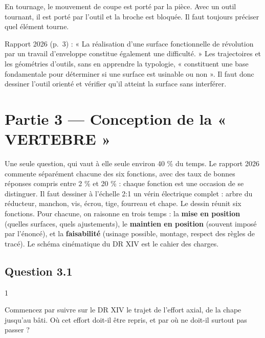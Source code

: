 \documentclass[11pt,a4paper]{article}
\begin{document}
\begin{methode}

En tournage, le mouvement de coupe est porté par la pièce. Avec un outil tournant, il est porté par l'outil et la broche est bloquée. Il faut toujours préciser quel élément tourne.

\end{methode}

\begin{jury}

Rapport 2026 (p.~3) : « La réalisation d'une surface fonctionnelle de révolution par un travail d'enveloppe constitue également une difficulté. » Les trajectoires et les géométries d'outils, sans en apprendre la typologie, « constituent une base fondamentale pour déterminer si une surface est usinable ou non ». Il faut donc dessiner l'outil orienté et vérifier qu'il atteint la surface sans interférer.

\end{jury}

\hypertarget{partie-3-conception-de-la-vertebre}{%
\section{Partie 3 --- Conception de la « VERTEBRE »}\label{partie-3-conception-de-la-vertebre}}

Une seule question, qui vaut à elle seule environ 40 \% du temps. Le rapport 2026 commente séparément chacune des six fonctions, avec des taux de bonnes réponses compris entre 2 \% et 20 \% : chaque fonction est une occasion de se distinguer. Il faut dessiner à l'échelle 2:1 un vérin électrique complet : arbre du réducteur, manchon, vis, écrou, tige, fourreau et chape. Le dessin réunit six fonctions. Pour chacune, on raisonne en trois temps : la \textbf{mise en position} (quelles surfaces, quels ajustements), le \textbf{maintien en position} (souvent imposé par l'énoncé), et la \textbf{faisabilité} (usinage possible, montage, respect des règles de tracé). Le schéma cinématique du DR XIV est le cahier des charges.

\hypertarget{question-3.1}{%
\subsection{Question 3.1}\label{question-3.1}}

\begin{indication}{1}

Commencez par suivre sur le DR XIV le trajet de l'effort axial, de la chape jusqu'au bâti. Où cet effort doit-il être repris, et par où ne doit-il surtout pas passer ?

\end{indication}
\end{document}
